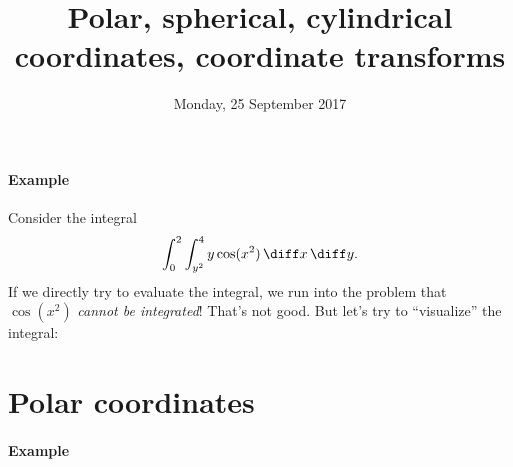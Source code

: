 \documentclass{multi}
\title{Polar, spherical, cylindrical coordinates, coordinate transforms}
\date{Monday, 25 September 2017}
\begin{document}
\paragraph{Example}

Consider the integral
\[
    \int_0^2 \int_{y^2}^{4} y \cos (x^2) \, \diff x \, \diff y.
\]
If we directly try to evaluate the integral, we run into the problem that \(\cos (x^2)\) \emph{cannot be integrated}! That's not good. But let's try to ``visualize'' the integral:
\begin{center}
\end{center}

\section*{Polar coordinates}

\paragraph{Example}
 
\newcommand{\pie}{
    \fill[lightgray]
        (0,0) -- (2,0)
        arc[radius=2, start angle=0, end angle=-300]
        -- cycle;
    
    
    \draw
        (0,0) 
        circle[radius=2];
    
    \draw
        (2,0) -- (0,0) -- (-300:2);
}
\end{document}
